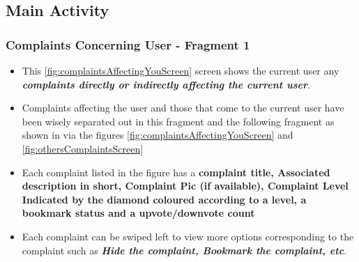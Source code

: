 \documentclass[12pt]{article}
\begin{document}
  
    \subsection{Main Activity}
    \subsubsection{Complaints Concerning User - Fragment 1}
    \par 
    \begin{itemize} 
    \item This \ref{fig:complaintsAffectingYouScreen} screen shows the current user any \textbf{\textit{complaints directly or indirectly affecting the current user}}.
    \item Complaints affecting the user and those that come to the current user have been wisely separated out in this fragment and the following fragment as shown in via the figures \ref{fig:complaintsAffectingYouScreen} and \ref{fig:othersComplaintsScreen}
    \item Each complaint listed in the figure has a \textbf{complaint title, Associated description in short, Complaint Pic (if available), Complaint Level Indicated by the diamond coloured according to a level, a bookmark status and a upvote/downvote count}
    \item Each complaint can be swiped left to view more options corresponding to the complaint such as \textbf{\textit{Hide the complaint, Bookmark the complaint, etc}}.
    
    \end{itemize}
\end{document}
